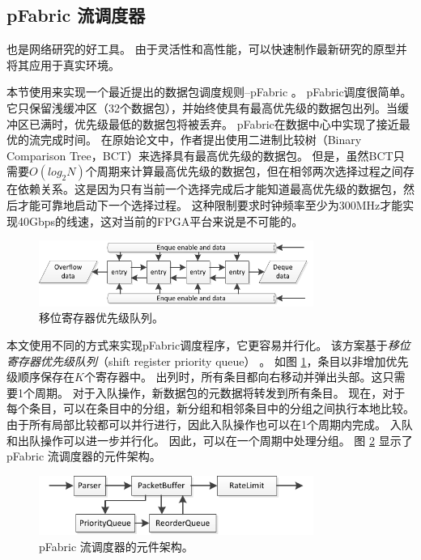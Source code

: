 \subsection{pFabric 流调度器}


\name 也是网络研究的好工具。
由于灵活性和高性能，\name 可以快速制作最新研究的原型并将其应用于真实环境。

本节使用\name 来实现一个最近提出的数据包调度规则--pFabric \cite {pfabric}。
pFabric调度很简单。它只保留浅缓冲区（32个数据包），并始终使具有最高优先级的数据包出列。当缓冲区已满时，优先级最低的数据包将被丢弃。
pFabric在数据中心中实现了接近最优的流完成时间。
在原始论文中，作者提出使用二进制比较树（Binary Comparison Tree，BCT）来选择具有最高优先级的数据包。
但是，虽然BCT只需要$O(log_2 N)$个周期来计算最高优先级的数据包，但在相邻两次选择过程之间存在依赖关系。这是因为只有当前一个选择完成后才能知道最高优先级的数据包，然后才能可靠地启动下一个选择过程。
这种限制要求时钟频率至少为300MHz才能实现40Gbps的线速，这对当前的FPGA平台来说是不可能的。



\begin{figure}[htbp]
	\centering
	\includegraphics[width=0.8\textwidth]{image/PriorityQueue}
	\caption{移位寄存器优先级队列。}
	\label{clicknp:fig:ShiftRegPrioQueue}
\end{figure}


本文使用不同的方式来实现pFabric调度程序，它更容易并行化。
该方案基于\textit{移位寄存器优先级队列}（shift register priority queue） \cite {moon2000scalable}。
如图 \ref{clicknp:fig:ShiftRegPrioQueue}，条目以非增加优先级顺序保存在$K$个寄存器中。
出列时，所有条目都向右移动并弹出头部。这只需要1个周期。
对于入队操作，新数据包的元数据将转发到所有条目。
现在，对于每个条目，可以在条目中的分组，新分组和相邻条目中的分组之间执行本地比较。
由于所有局部比较都可以并行进行，因此入队操作也可以在1个周期内完成。
入队和出队操作可以进一步并行化。
因此，可以在一个周期中处理分组。
图 \ref{clicknp:fig:pfabric-arch} 显示了 pFabric 流调度器的元件架构。


\begin{figure}[htbp]
	\centering
	\includegraphics[width=0.8\textwidth]{image/PFabric}
	\caption{pFabric 流调度器的元件架构。}
	\label{clicknp:fig:pfabric-arch}
\end{figure}

